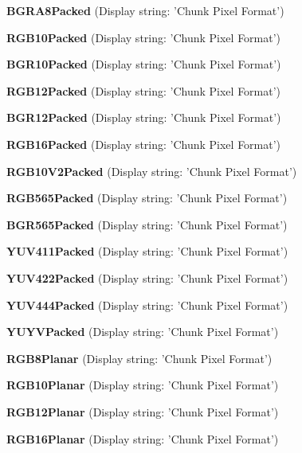 \begin{DoxyItemize}
\item {\bfseries B\+G\+R\+A8\+Packed} (Display string\+: 'Chunk Pixel Format')
\item {\bfseries R\+G\+B10\+Packed} (Display string\+: 'Chunk Pixel Format')
\item {\bfseries B\+G\+R10\+Packed} (Display string\+: 'Chunk Pixel Format')
\item {\bfseries R\+G\+B12\+Packed} (Display string\+: 'Chunk Pixel Format')
\item {\bfseries B\+G\+R12\+Packed} (Display string\+: 'Chunk Pixel Format')
\item {\bfseries R\+G\+B16\+Packed} (Display string\+: 'Chunk Pixel Format')
\item {\bfseries R\+G\+B10\+V2\+Packed} (Display string\+: 'Chunk Pixel Format')
\item {\bfseries R\+G\+B565\+Packed} (Display string\+: 'Chunk Pixel Format')
\item {\bfseries B\+G\+R565\+Packed} (Display string\+: 'Chunk Pixel Format')
\item {\bfseries Y\+U\+V411\+Packed} (Display string\+: 'Chunk Pixel Format')
\item {\bfseries Y\+U\+V422\+Packed} (Display string\+: 'Chunk Pixel Format')
\item {\bfseries Y\+U\+V444\+Packed} (Display string\+: 'Chunk Pixel Format')
\item {\bfseries Y\+U\+Y\+V\+Packed} (Display string\+: 'Chunk Pixel Format')
\item {\bfseries R\+G\+B8\+Planar} (Display string\+: 'Chunk Pixel Format')
\item {\bfseries R\+G\+B10\+Planar} (Display string\+: 'Chunk Pixel Format')
\item {\bfseries R\+G\+B12\+Planar} (Display string\+: 'Chunk Pixel Format')
\item {\bfseries R\+G\+B16\+Planar} (Display string\+: 'Chunk Pixel Format')
\end{DoxyItemize}

